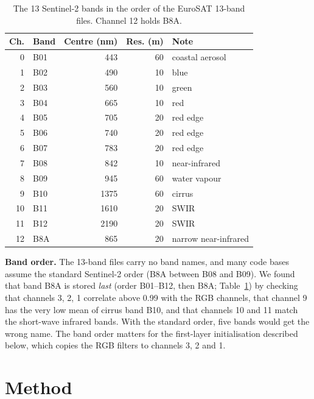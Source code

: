 \documentclass[conference]{IEEEtran}
\begin{document}
\begin{table}[t]
\centering
\caption{The 13 Sentinel-2 bands in the order of the EuroSAT 13-band files. Channel 12 holds B8A.}
\label{tab:bands}
\small
\begin{tabular}{rlrrl}
\toprule
Ch. & Band & Centre (nm) & Res. (m) & Note \\
\midrule
0 & B01 & 443 & 60 & coastal aerosol \\
1 & B02 & 490 & 10 & blue \\
2 & B03 & 560 & 10 & green \\
3 & B04 & 665 & 10 & red \\
4 & B05 & 705 & 20 & red edge \\
5 & B06 & 740 & 20 & red edge \\
6 & B07 & 783 & 20 & red edge \\
7 & B08 & 842 & 10 & near-infrared \\
8 & B09 & 945 & 60 & water vapour \\
9 & B10 & 1375 & 60 & cirrus \\
10 & B11 & 1610 & 20 & SWIR \\
11 & B12 & 2190 & 20 & SWIR \\
12 & B8A & 865 & 20 & narrow near-infrared \\
\bottomrule
\end{tabular}
\end{table}

\textbf{Band order.} The 13-band files carry no band names, and many code bases assume the standard Sentinel-2 order (B8A between B08 and B09). We found that band B8A is stored \emph{last} (order B01--B12, then B8A; Table~\ref{tab:bands}) by checking that channels 3, 2, 1 correlate above 0.99 with the RGB channels, that channel 9 has the very low mean of cirrus band B10, and that channels 10 and 11 match the short-wave infrared bands. With the standard order, five bands would get the wrong name. The band order matters for the first-layer initialisation described below, which copies the RGB filters to channels 3, 2 and 1.

\section{Method}\label{sec:method}
\end{document}

